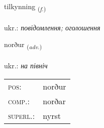 \documentclass[frontgrid, backgrid]{flacards}\usepackage[]{graphicx}\usepackage[]{xcolor}
\begin{document}
\renewcommand{\flhead}{\vskip5pt \fboxsep=0pt {\small\bfseries\footnotesize Nafnorð | іменник}}
\renewcommand{\fcfoot}{\vskip5pt \fboxsep=0pt \hspace{2pt}{\small\bfseries\footnotesize 2K}}

\renewcommand{\blhead}{\vskip5pt {\small\bfseries\footnotesize Nafnorð | іменник }}
\renewcommand{\bcfoot}{\vskip5pt \hspace{2pt}{\small\bfseries\footnotesize 2K}}


{tilkynning \small{\textsubscript{(\textit{f.})}} \\[1ex] %
\textphonetic{[tʰɪlcʰɪniŋk]} \\
ukr.: \emph{повідомлення; оголошення} \\  [2ex]
\renewcommand*{\arraystretch}{0.8}
}

\renewcommand{\flhead}{\vskip5pt \fboxsep=0pt {\small\bfseries\footnotesize Atviksorð | прислівник}}
\renewcommand{\fcfoot}{\vskip5pt \fboxsep=0pt \hspace{2pt}{\small\bfseries\footnotesize 2K}}

\renewcommand{\blhead}{\vskip5pt {\small\bfseries\footnotesize Atviksorð | прислівник }}
\renewcommand{\bcfoot}{\vskip5pt \hspace{2pt}{\small\bfseries\footnotesize 2K}}


{norður \small{\textsubscript{(\textit{adv.})}} \\[1ex] %
\textphonetic{[nɔrðʏr]} \\
ukr.: \emph{на північ} \\  [2ex]
\renewcommand*{\arraystretch}{0.8}
\begin{tabular}{ll}
\textsc{pos}: & norður \\ 
\textsc{comp.}: & norðar \\ 
\textsc{superl.}: & nyrst \\
\end{tabular}
}
\end{document}
